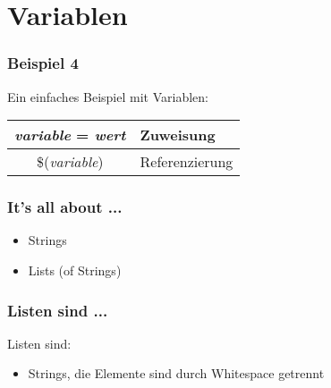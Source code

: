 \section{Variablen}
\begin{frame}
	\frametitle{Beispiel 4}
    Ein einfaches Beispiel mit Variablen:
      
 
  \begin{tabular}{|c|l|}
    \hline
    \textit{variable} = \textit{wert} & Zuweisung \\ \hline 
    \$(\textit{variable}) & Referenzierung \\ \hline
  \end{tabular}
\end{frame}


\begin{frame}
	\frametitle{It's all about ...}
	\begin{itemize}
    \item<2-> \huge{Strings}
    \item<3-> \huge{Lists (of Strings)}
    \end{itemize}
\end{frame}

\begin{frame}
	\frametitle{Listen sind ...}
    \begin{Large}
	Listen sind:
    \begin{itemize}
    \item<2-> Strings, die Elemente sind durch Whitespace getrennt
    \end{itemize}
    \end{Large}
\end{frame}

